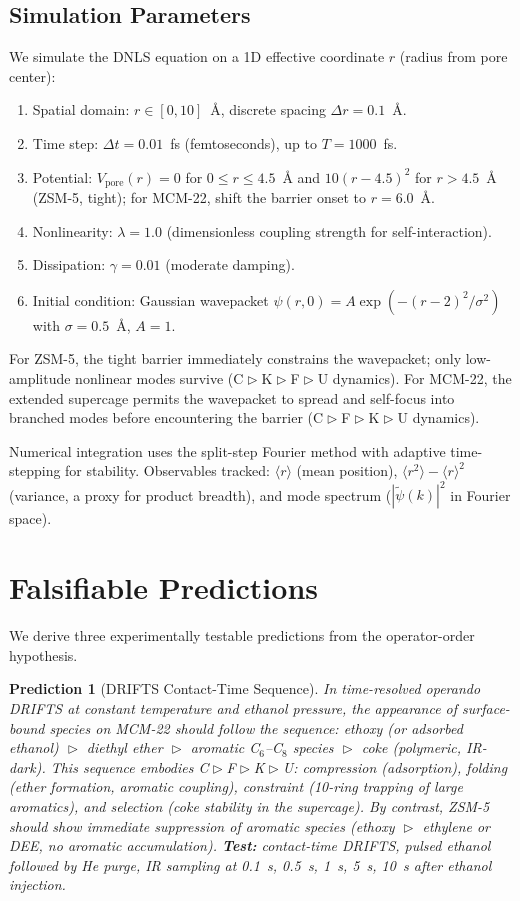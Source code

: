 \documentclass[11pt]{article}
\newtheorem{prediction}{Prediction}
\newcommand{\comp}{\mathrel{\triangleright}} %
\begin{document}
\subsection{Simulation Parameters}

We simulate the DNLS equation on a 1D effective coordinate $r$ (radius from pore center):
\begin{enumerate}[itemsep=1pt]
\item Spatial domain: $r \in [0,10]$~\AA, discrete spacing $\Delta r = 0.1$~\AA.
\item Time step: $\Delta t = 0.01$~fs (femtoseconds), up to $T=1000$~fs.
\item Potential: $V_{\mathrm{pore}}(r) = 0$ for $0 \le r \le 4.5$~\AA{} and $10(r-4.5)^2$ for $r>4.5$~\AA{} (ZSM-5, tight); for MCM-22, shift the barrier onset to $r=6.0$~\AA.
\item Nonlinearity: $\lambda = 1.0$ (dimensionless coupling strength for self-interaction).
\item Dissipation: $\gamma = 0.01$ (moderate damping).
\item Initial condition: Gaussian wavepacket $\psi(r,0) = A\exp(-(r-2)^2/\sigma^2)$ with $\sigma=0.5$~\AA, $A=1$.
\end{enumerate}

For ZSM-5, the tight barrier immediately constrains the wavepacket; only low-amplitude nonlinear modes survive (C$\comp$K$\comp$F$\comp$U dynamics). For MCM-22, the extended supercage permits the wavepacket to spread and self-focus into branched modes before encountering the barrier (C$\comp$F$\comp$K$\comp$U dynamics).

Numerical integration uses the split-step Fourier method with adaptive time-stepping for stability. Observables tracked: $\langle r \rangle$ (mean position), $\langle r^2\rangle - \langle r\rangle^2$ (variance, a proxy for product breadth), and mode spectrum ($|\tilde\psi(k)|^2$ in Fourier space).

\section{Falsifiable Predictions}

We derive three experimentally testable predictions from the operator-order hypothesis.

\begin{prediction}[DRIFTS Contact-Time Sequence]
In time-resolved operando DRIFTS at constant temperature and ethanol pressure, the appearance of surface-bound species on MCM-22 should follow the sequence: ethoxy (or adsorbed ethanol) $\comp$ diethyl ether $\comp$ aromatic C$_6$--C$_8$ species $\comp$ coke (polymeric, IR-dark). This sequence embodies C$\comp$F$\comp$K$\comp$U: compression (adsorption), folding (ether formation, aromatic coupling), constraint (10-ring trapping of large aromatics), and selection (coke stability in the supercage). By contrast, ZSM-5 should show immediate suppression of aromatic species (ethoxy $\comp$ ethylene or DEE, no aromatic accumulation). \textbf{Test:} contact-time DRIFTS, pulsed ethanol followed by He purge, IR sampling at 0.1~s, 0.5~s, 1~s, 5~s, 10~s after ethanol injection.
\end{prediction}
\end{document}

